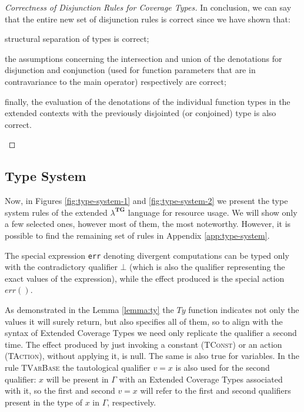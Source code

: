 \begin{proof}[Correctness of Disjunction Rules for Coverage Types]
    In conclusion, we can say that the entire new set of disjunction rules is correct since we have shown that:
    \begin{enumerate*}[label=(\roman*)]
        \item structural separation of types is correct; 
        \item the assumptions concerning the intersection and union of the denotations for disjunction and conjunction (used for function parameters that are in contravariance to the main operator) respectively are correct; 
        \item finally, the evaluation of the denotations of the individual function types in the extended contexts with the previously disjointed (or conjoined) type is also correct.
    \end{enumerate*}
\end{proof}

\subsection{Type System}

Now, in Figures \ref{fig:type-system-1} and \ref{fig:type-system-2} we present the type system rules of the extended $\lambda^{\textbf{TG}}$ language for resource usage. We will show only a few selected ones, however most of them, the most noteworthy. However, it is possible to find the remaining set of rules in Appendix \ref{app:type-system}.

The special expression \verb|err| denoting divergent computations can be typed only with the contradictory qualifier $\bot$ (which is also the qualifier representing the exact values of the expression), while the effect produced is the special action $err()$.

As demonstrated in the Lemma \ref{lemma:ty} the $Ty$ function indicates not only the values it will surely return, but also specifies all of them, so to align with the syntax of Extended Coverage Types we need only replicate the qualifier a second time. The effect produced by just invoking a constant (\textsc{TConst}) or an action (\textsc{TAction}), without applying it, is null. The same is also true for variables. In the rule \textsc{TVarBase} the tautological qualifier $v = x$ is also used for the second qualifier: $x$ will be present in $\Gamma$ with an Extended Coverage Types associated with it, so the first and second $v = x$ will refer to the first and second qualifiers present in the type of $x$ in $\Gamma$, respectively.

